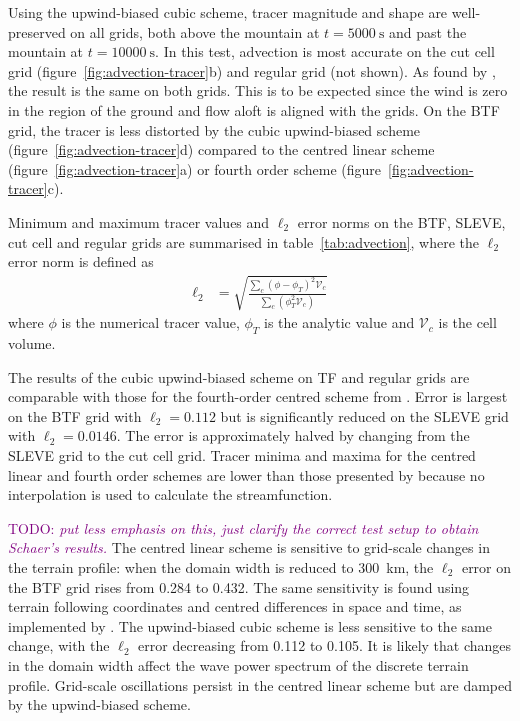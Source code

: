\documentclass{ametsoc}
\newcommand{\TODO}[1]{\textcolor{purple}{TODO: \emph{#1}}}
\begin{document}
Using the upwind-biased cubic scheme, tracer magnitude and shape are well-preserved on all grids, both above the mountain at \(t = \SI{5000}{\second}\) and past the mountain at \(t = \SI{10000}{\second}\).  In this test, advection is most accurate on the cut cell grid (figure~\ref{fig:advection-tracer}b) and regular grid (not shown).  As found by \citet{good2014}, the result is the same on both grids.  This is to be expected since the wind is zero in the region of the ground and flow aloft is aligned with the grids.  On the BTF grid, the tracer is less distorted by the cubic upwind-biased scheme (figure~\ref{fig:advection-tracer}d) compared to the centred linear scheme (figure~\ref{fig:advection-tracer}a) or fourth order scheme (figure~\ref{fig:advection-tracer}c).

Minimum and maximum tracer values and \(\ell_2\) error norms on the BTF, SLEVE, cut cell and regular grids are summarised in table~\ref{tab:advection}, where the \(\ell_2\) error norm is defined as 
\begin{align}
	\ell_2 &= \sqrt{\frac{\sum_c \left( \phi - \phi_{T} \right)^2 \mathcal{V}_c}{\sum_c \left( \phi_T^2 \mathcal{V}_c \right)}} \label{eqn:l2-error}
\end{align}
where $\phi$ is the numerical tracer value, $\phi_T$ is the analytic value and $\mathcal{V}_c$ is the cell volume.

The results of the cubic upwind-biased scheme on TF and regular grids are comparable with those for the fourth-order centred scheme from \citet{schaer2002}.  Error is largest on the BTF grid with \(\ell_2 = \num{0.112}\) but is significantly reduced on the SLEVE grid with \(\ell_2 = \num{0.0146}\).  The error is approximately halved by changing from the SLEVE grid to the cut cell grid.
Tracer minima and maxima for the centred linear and fourth order schemes are lower than those presented by \citet{schaer2002} because no interpolation is used to calculate the streamfunction.

\TODO{put less emphasis on this, just clarify the correct test setup to obtain Schaer's results.}
The centred linear scheme is sensitive to grid-scale changes in the terrain profile: when the domain width is reduced to \SI{300}{\kilo\meter}, the $\ell_2$ error on the BTF grid rises from \num{0.284} to \num{0.432}.  The same sensitivity is found using terrain following coordinates and centred differences in space and time, as implemented by \citet{schaer2002}.  The upwind-biased cubic scheme is less sensitive to the same change, with the $\ell_2$ error decreasing from \num{0.112} to \num{0.105}.  It is likely that changes in the domain width affect the wave power spectrum of the discrete terrain profile.  Grid-scale oscillations persist in the centred linear scheme but are damped by the upwind-biased scheme.
\end{document}
